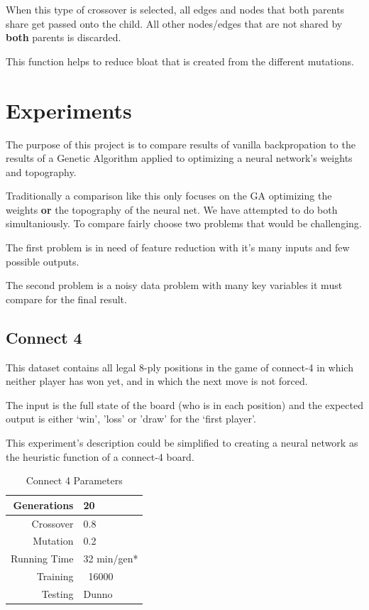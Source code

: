 \documentclass[journal]{IEEEtran}
\begin{document}
    When this type of crossover is selected, all edges and nodes that both parents share get
    passed onto the child. All other nodes/edges that are not shared by \textbf{both} parents
    is discarded. 
    
    This function helps to reduce bloat that is created from the different mutations.
    
\section{Experiments}
  The purpose of this project is to compare results of vanilla backpropation to the results of
  a Genetic Algorithm applied to optimizing a neural network's weights and topography. 
  
  Traditionally a comparison like this only focuses on the GA optimizing the weights \textbf{or}
  the topography of the neural net. We have attempted to do both simultaniously. To compare fairly
  choose two problems that would be challenging.
  
  The first problem is in need of feature reduction with it's many inputs and few possible outputs.
  
  The second problem is a noisy data problem with many key variables it must compare for the final
  result.

  \subsection{Connect 4}
   This dataset contains all legal 8-ply positions in the game of
   connect-4 in which neither player has won yet, and in which the next
   move is not forced.    
   
   The input is the full state of the board (who is in each position) and the expected output
   is either `win', 'loss' or 'draw' for the `first player'.
   
   This experiment's description could be simplified to creating a neural network as the heuristic
   function of a connect-4 board.
   
   \begin{table}[here]
    \renewcommand{\arraystretch}{1.3}
    \caption{Connect 4 Parameters}
    \label{E1}
    \centering
    \begin{tabular}{r||l}
      \hline
      Generations & 20  \\ \hline
      Crossover   & 0.8 \\ \hline
      Mutation    & 0.2 \\ \hline
      Running Time & 32 min/gen* \\ \hline
      Training    & ~16000 \\ \hline
      Testing     & Dunno \\ \hline
    \end{tabular}
   \end{table}
    
\end{document}
